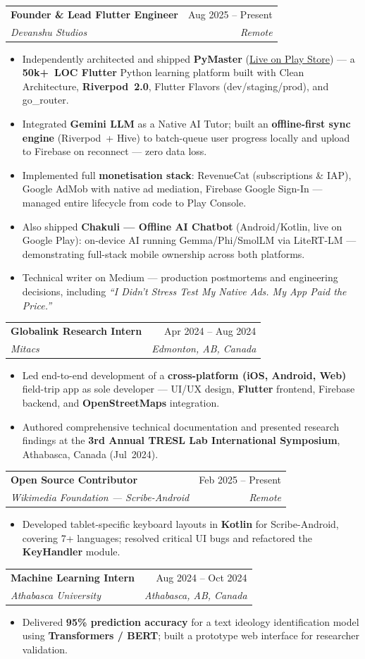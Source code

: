 \documentclass[letterpaper,11pt]{article}
\makeatletter
\newcommand{\resumeItem}[1]{\item\small{#1}}
\newcommand{\resumeSubheading}[4]{
  \vspace{-1pt}\item
    \begin{tabular*}{0.97\textwidth}[t]{l@{\extracolsep{\fill}}r}
      \textbf{#1} & \small #2 \\
      \textit{\small #3} & \textit{\small #4} \\
    \end{tabular*}\vspace{-5pt}
}
\newcommand{\resumeItemListStart}{
  \begin{itemize}[leftmargin=0.20in, itemsep=1pt, parsep=0pt, topsep=2pt]
}
\newcommand{\resumeItemListEnd}{\end{itemize}\vspace{2pt}}
\makeatother
\begin{document}
  \resumeSubheading
    {Founder \& Lead Flutter Engineer}{Aug 2025 -- Present}
    {Devanshu Studios}{Remote}
    \resumeItemListStart
      \resumeItem{Independently architected and shipped \textbf{PyMaster} (\href{https://play.google.com/store/apps/details?id=com.devanshustudios.pymaster}{\underline{Live on Play Store}}) — a \textbf{50k+~LOC Flutter} Python learning platform built with Clean Architecture, \textbf{Riverpod~2.0}, Flutter Flavors (dev/staging/prod), and go\_router.}
      \resumeItem{Integrated \textbf{Gemini LLM} as a Native AI Tutor; built an \textbf{offline-first sync engine} (Riverpod~+ Hive) to batch-queue user progress locally and upload to Firebase on reconnect — zero data loss.}
      \resumeItem{Implemented full \textbf{monetisation stack}: RevenueCat (subscriptions \& IAP), Google AdMob with native ad mediation, Firebase Google Sign-In — managed entire lifecycle from code to Play Console.}
      \resumeItem{Also shipped \textbf{Chakuli — Offline AI Chatbot} (Android/Kotlin, live on Google Play): on-device AI running Gemma/Phi/SmolLM via LiteRT-LM — demonstrating full-stack mobile ownership across both platforms.}
      \resumeItem{Technical writer on Medium — production postmortems and engineering decisions, including \textit{``I Didn't Stress Test My Native Ads. My App Paid the Price.''}}
    \resumeItemListEnd

  \resumeSubheading
    {Globalink Research Intern}{Apr 2024 -- Aug 2024}
    {Mitacs}{Edmonton, AB, Canada}
    \resumeItemListStart
      \resumeItem{Led end-to-end development of a \textbf{cross-platform (iOS, Android, Web)} field-trip app as sole developer — UI/UX design, \textbf{Flutter} frontend, Firebase backend, and \textbf{OpenStreetMaps} integration.}
      \resumeItem{Authored comprehensive technical documentation and presented research findings at the \textbf{3rd Annual TRESL Lab International Symposium}, Athabasca, Canada (Jul~2024).}
    \resumeItemListEnd

  \resumeSubheading
    {Open Source Contributor}{Feb 2025 -- Present}
    {Wikimedia Foundation — Scribe-Android}{Remote}
    \resumeItemListStart
      \resumeItem{Developed tablet-specific keyboard layouts in \textbf{Kotlin} for Scribe-Android, covering 7+ languages; resolved critical UI bugs and refactored the \textbf{KeyHandler} module.}
    \resumeItemListEnd

  \resumeSubheading
    {Machine Learning Intern}{Aug 2024 -- Oct 2024}
    {Athabasca University}{Athabasca, AB, Canada}
    \resumeItemListStart
      \resumeItem{Delivered \textbf{95\% prediction accuracy} for a text ideology identification model using \textbf{Transformers / BERT}; built a prototype web interface for researcher validation.}
    \resumeItemListEnd
\end{document}
